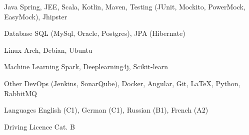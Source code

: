 
\begin{cvskills}

    \cvskill
    {Java}
    {Spring, JEE, Scala, Kotlin, Maven, Testing (JUnit, Mockito, PowerMock, EasyMock), Jhipster} %

    \cvskill
    {Database}
    {SQL (MySql, Oracle, Postgres), JPA (Hibernate)}

    \cvskill
    {Linux}
    {Arch, Debian, Ubuntu}

    \cvskill
    {Machine Learning}
    {Spark, Deeplearning4j, Scikit-learn}

    \cvskill
    {Other}
    {DevOps (Jenkins, SonarQube), Docker, Angular, Git, LaTeX, Python, RabbitMQ}

    \cvskill
    {Languages}
    {English (C1), German (C1), Russian (B1), French (A2)}

    \cvskill
    {Driving Licence}
    {Cat. B}

\end{cvskills}
